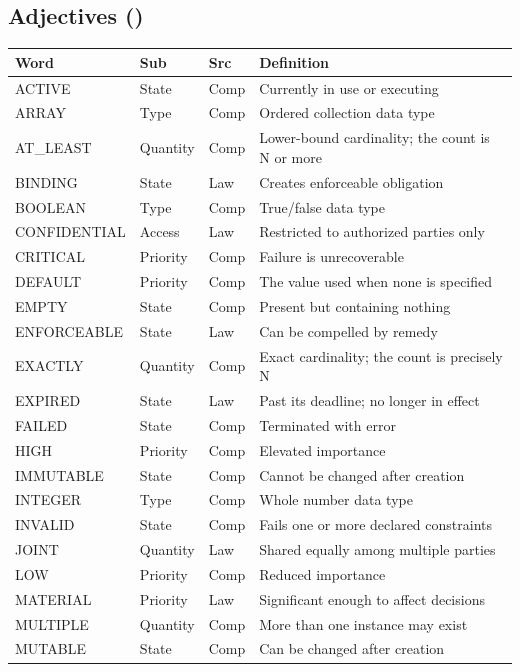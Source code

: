 \documentclass{article}
\begin{document}
\subsection{Adjectives (\VocabAdjectives)}
\small
\begin{tabular}{lllp{7cm}}
\toprule \textbf{Word} & \textbf{Sub} & \textbf{Src} & \textbf{Definition} \\ \midrule
ACTIVE & State & Comp & Currently in use or executing \\
ARRAY & Type & Comp & Ordered collection data type \\
AT\_LEAST & Quantity & Comp & Lower-bound cardinality; the count is N or more \\
BINDING & State & Law & Creates enforceable obligation \\
BOOLEAN & Type & Comp & True/false data type \\
CONFIDENTIAL & Access & Law & Restricted to authorized parties only \\
CRITICAL & Priority & Comp & Failure is unrecoverable \\
DEFAULT & Priority & Comp & The value used when none is specified \\
EMPTY & State & Comp & Present but containing nothing \\
ENFORCEABLE & State & Law & Can be compelled by remedy \\
EXACTLY & Quantity & Comp & Exact cardinality; the count is precisely N \\
EXPIRED & State & Law & Past its deadline; no longer in effect \\
FAILED & State & Comp & Terminated with error \\
HIGH & Priority & Comp & Elevated importance \\
IMMUTABLE & State & Comp & Cannot be changed after creation \\
INTEGER & Type & Comp & Whole number data type \\
INVALID & State & Comp & Fails one or more declared constraints \\
JOINT & Quantity & Law & Shared equally among multiple parties \\
LOW & Priority & Comp & Reduced importance \\
MATERIAL & Priority & Law & Significant enough to affect decisions \\
MULTIPLE & Quantity & Comp & More than one instance may exist \\
MUTABLE & State & Comp & Can be changed after creation \\

\end{tabular}
\end{document}

